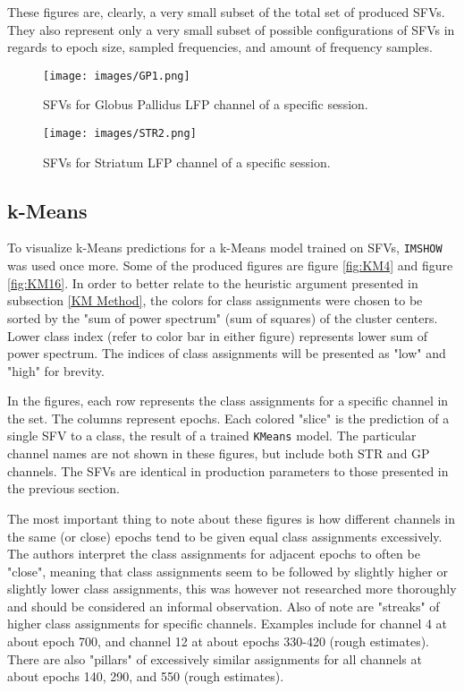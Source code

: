 \documentclass{article}
\begin{document}
These figures are, clearly, a very small subset of the total set of produced SFVs. They also represent only a very small subset of possible configurations of SFVs in regards to epoch size, sampled frequencies, and amount of frequency samples.

\begin{figure}[H]
    \centering
    \centerline{\texttt{[image: images/GP1.png]}}
    \caption{SFVs for Globus Pallidus LFP channel of a specific session.}
    \label{fig:GP1}
\end{figure}

\begin{figure}[H]
    \centering
    \centerline{\texttt{[image: images/STR2.png]}}
    \caption{SFVs for Striatum LFP channel of a specific session.}
    \label{fig:STR2}
\end{figure}

\subsection{k-Means}

To visualize k-Means predictions for a k-Means model trained on SFVs, \texttt{IMSHOW} was used once more.
Some of the produced figures are figure \ref{fig:KM4} and figure \ref{fig:KM16}.
In order to better relate to the heuristic argument presented in subsection \ref{KM Method}, the colors for class assignments were chosen to be sorted by the "sum of power spectrum" (sum of squares) of the cluster centers.
Lower class index (refer to color bar in either figure) represents lower sum of power spectrum.
The indices of class assignments will be presented as "low" and "high" for brevity.

In the figures, each row represents the class assignments for a specific channel in the set.
The columns represent epochs.
Each colored "slice" is the prediction of a single SFV to a class, the result of a trained \texttt{KMeans} model.
The particular channel names are not shown in these figures, but include both STR and GP channels.
The SFVs are identical in production parameters to those presented in the previous section.

The most important thing to note about these figures is how different channels in the same (or close) epochs tend to be given equal class assignments excessively. 
The authors interpret the class assignments for adjacent epochs to often be "close", meaning that class assignments seem to be followed by slightly higher or slightly lower class assignments, this was however not researched more thoroughly and should be considered an informal observation.
Also of note are "streaks" of higher class assignments for specific channels.
Examples include for channel 4 at about epoch 700, and channel 12 at about epochs 330-420 (rough estimates).
There are also "pillars" of excessively similar assignments for all channels at about epochs 140, 290, and 550 (rough estimates).
\end{document}
